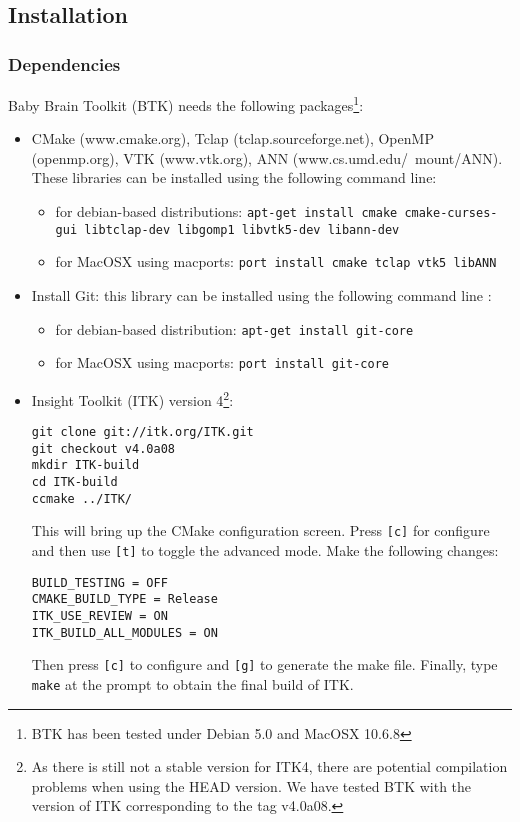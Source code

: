 \documentclass[a4paper,10pt]{article}
\begin{document}
\subsection{Installation}

\subsubsection{Dependencies}

Baby Brain Toolkit (BTK) needs the following packages\footnote{BTK has been tested under Debian 5.0 and MacOSX 10.6.8}:
\begin{itemize}
 \item CMake (www.cmake.org), Tclap (tclap.sourceforge.net), OpenMP
(openmp.org), VTK (www.vtk.org), ANN (www.cs.umd.edu/\string~mount/ANN). These
libraries can be installed using the following command line: 
 \begin{itemize}
 \item for debian-based distributions: \texttt{apt-get install cmake
cmake-curses-gui
 libtclap-dev libgomp1 libvtk5-dev libann-dev}
 \item for MacOSX using macports: \texttt{port install cmake tclap vtk5 libANN}
 \end{itemize}
 \item Install Git: this library can be installed using the following command line : 
 \begin{itemize}
 \item for debian-based distribution: \texttt{apt-get install git-core}
 \item for MacOSX using macports: \texttt{port install git-core}
 \end{itemize}
 \item Insight Toolkit (ITK) version 4\footnote{As there is still not a stable version for ITK4, there are potential compilation problems when using the HEAD version. We have tested BTK with the version of ITK corresponding to the tag v4.0a08.}:
\begin{verbatim}
git clone git://itk.org/ITK.git
git checkout v4.0a08
mkdir ITK-build
cd ITK-build
ccmake ../ITK/
\end{verbatim}
This will bring up the CMake configuration screen. Press \texttt{[c]} for
configure and then use \texttt{[t]} to toggle the advanced mode. Make the
following changes:
\begin{verbatim}
BUILD_TESTING = OFF
CMAKE_BUILD_TYPE = Release
ITK_USE_REVIEW = ON
ITK_BUILD_ALL_MODULES = ON
\end{verbatim}
Then press \texttt{[c]} to configure and \texttt{[g]} to generate the make file.
Finally, type \texttt{make} at the prompt to obtain the final build of ITK.

\end{itemize}
\end{document}
